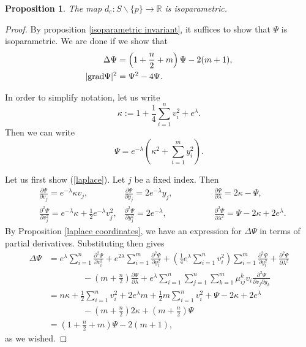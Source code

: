 \documentclass{amsart}
\newcommand{\R}{\mathbb R}
\newcommand{\grad}{\text{\normalfont grad}}
\theoremstyle{plain}
\newtheorem{proposition}[theorem]{Proposition}
\theoremstyle{definition}
\theoremstyle{remark}
\begin{document}
	\begin{proposition}
		The map $d_e:S\backslash\{p\} \rightarrow \R$ is isoparametric.
	\end{proposition}
	\begin{proof}
		By proposition \ref{isoparametric invariant}, it suffices to show that $\Psi$ is isoparametric. We are done if we show that
		\begin{align}
			\Delta \Psi &= \left(1+\frac n2 + m\right)\Psi - 2(m+1), \label{laplace}\\
			|\grad \Psi|^2 &= \Psi^2 - 4 \Psi. \label{grad}
		\end{align}
	
		In order to simplify notation, let us write
		$$\kappa := 1 + \frac14 \sum_{i=1}^n v_i^2 + e^\lambda.$$
		Then we can write 
		$$\Psi = e^{-\lambda} \left(\kappa^2 + \sum_{i=1}^m y_i^2\right).$$
		
		Let us first show (\ref{laplace}). Let $j$ be a fixed index. Then
		\begin{align*}
			&\frac{\partial\Psi }{\partial v_j} = e^{-\lambda }\kappa v_j, 
			&\frac{\partial\Psi }{\partial y_j}  = 2e^{-\lambda }y_j,  \qquad \qquad 
			&\frac{\partial\Psi}{\partial \lambda} =2\kappa - \Psi, \\
			&\frac{\partial^2 \Psi}{\partial v_j^2} = e^{-\lambda } \kappa + \frac12 e^{-\lambda} v_j^2, 
			&\frac{\partial^2 \Psi}{ \partial y_j^2} = 2e^{-\lambda},  \qquad  \qquad
			&\frac{\partial^2 \Psi}{ \partial \lambda^2} =  \Psi - 2\kappa + 2e^{\lambda}.
		\end{align*}
		By Proposition \ref{laplace coordinates}, we have an expression for $\Delta \Psi$ in terms of partial derivatives. Substituting then gives
		\begin{align*}
			\Delta \Psi &= e^\lambda \sum_{i=1}^n \frac{\partial^2\Psi}{\partial v_i^2} + e^{2 \lambda} \sum_{i=1}^m \frac{\partial^2\Psi}{\partial y_i^2} + \left( \frac14 e^\lambda \sum_{i=1}^n v_i^2\right) \sum_{i=1}^m \frac{\partial^2\Psi}{\partial y_i^2} + \frac{\partial^2\Psi}{\partial \lambda^2} \\
			&\qquad\qquad- \left( m+ \frac n2\right) \frac{\partial\Psi}{\partial \lambda} + e^\lambda \sum_{i=1}^n \sum_{j=1}^n \sum_{k=1}^m \mu_{ij}^k v_i  \frac{\partial^2\Psi}{\partial v_j\partial y_k } \\
			&= n \kappa + \frac12 \sum_{i=1}^n v_i^2 + 2e^\lambda m + \frac12 m \sum_{i=1}^n v_i^2 + \Psi - 2\kappa + 2e^\lambda \\
			&\qquad\qquad - \left(m + \frac n2\right)2 \kappa + \left(m + \frac n2\right) \Psi \\
			&= \left(1+\frac n2 + m\right)\Psi - 2(m+1),
		\end{align*}
		as we wished.
		

\end{proof}
\end{document}
